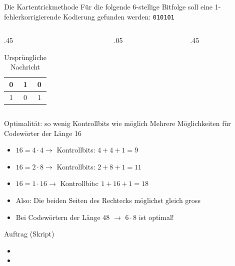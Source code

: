 \begin{frame}{Die Kartentrickmethode}
    Für die folgende 6-stellige Bitfolge soll eine 1-fehlerkorrigierende Kodierung gefunden werden: \texttt{010101}
    \begin{columns}
        \begin{column}{.45\textwidth}
            \begin{table}[H]
                \centering
                \begin{tabular}{c|c|c}
                    0 & 1 & 0 \\\midrule
                    1 & 0 & 1 \\
                \end{tabular}
                \caption*{Ursprüngliche Nachricht}
                \label{tab:ex-zauberer}
            \end{table}
        \end{column}
        \begin{column}{.05\textwidth}
        \end{column}
        \begin{column}{.45\textwidth}
        \end{column}
    \end{columns}
\end{frame}

\begin{frame}{Optimalität: so wenig Kontrollbits wie möglich}
    Mehrere Möglichkeiten für Codewörter der Länge 16
    \begin{itemize}[<+->]
        \item $16 = 4 \cdot 4 \rightarrow$ Kontrollbits: $4 + 4 + 1 = 9$
        \item $16 = 2 \cdot 8 \rightarrow$ Kontrollbits: $2 + 8 + 1 = 11$
        \item $16 = 1 \cdot 16 \rightarrow$ Kontrollbits: $1 + 16 + 1 = 18$
        \item Also: Die beiden Seiten des Rechtecks möglichst gleich gross
        \item Bei Codewörtern der Länge 48 $\rightarrow$ $6 \cdot 8$ ist optimal!
    \end{itemize}
\end{frame}

\begin{frame}{Auftrag (Skript)}
    \begin{itemize}
        \item {}
        \item {}
    \end{itemize}
\end{frame}